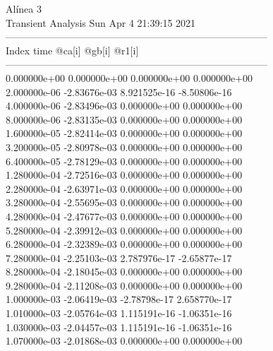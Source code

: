                                    Alínea 3 \\ \hline
                                   Transient Analysis  Sun Apr  4 21:39:15  2021\\ \hline
--------------------------------------------------------------------------------\\ \hline
Index   time            @ca[i]          @gb[i]          @r1[i]          \\ \hline
--------------------------------------------------------------------------------\\ 	0.000000e+00	0.000000e+00	0.000000e+00	0.000000e+00	\\ 	2.000000e-06	-2.83676e-03	8.921525e-16	-8.50806e-16	\\ 	4.000000e-06	-2.83496e-03	0.000000e+00	0.000000e+00	\\ 	8.000000e-06	-2.83135e-03	0.000000e+00	0.000000e+00	\\ 	1.600000e-05	-2.82414e-03	0.000000e+00	0.000000e+00	\\ 	3.200000e-05	-2.80978e-03	0.000000e+00	0.000000e+00	\\ 	6.400000e-05	-2.78129e-03	0.000000e+00	0.000000e+00	\\ 	1.280000e-04	-2.72516e-03	0.000000e+00	0.000000e+00	\\ 	2.280000e-04	-2.63971e-03	0.000000e+00	0.000000e+00	\\ 	3.280000e-04	-2.55695e-03	0.000000e+00	0.000000e+00	\\ 	4.280000e-04	-2.47677e-03	0.000000e+00	0.000000e+00	\\ 	5.280000e-04	-2.39912e-03	0.000000e+00	0.000000e+00	\\ 	6.280000e-04	-2.32389e-03	0.000000e+00	0.000000e+00	\\ 	7.280000e-04	-2.25103e-03	2.787976e-17	-2.65877e-17	\\ 	8.280000e-04	-2.18045e-03	0.000000e+00	0.000000e+00	\\ 	9.280000e-04	-2.11208e-03	0.000000e+00	0.000000e+00	\\ 	1.000000e-03	-2.06419e-03	-2.78798e-17	2.658770e-17	\\ 	1.010000e-03	-2.05764e-03	1.115191e-16	-1.06351e-16	\\ 	1.030000e-03	-2.04457e-03	1.115191e-16	-1.06351e-16	\\ 	1.070000e-03	-2.01868e-03	0.000000e+00	0.000000e+00	\\ \hline
